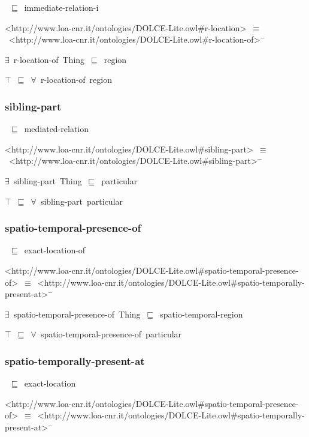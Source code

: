 \documentclass{article}
\begin{document}
~\ensuremath{\sqsubseteq}~immediate-relation-i

<http://www.loa-cnr.it/ontologies/DOLCE-Lite.owl#r-location>~\ensuremath{\equiv}~<http://www.loa-cnr.it/ontologies/DOLCE-Lite.owl#r-location-of>\ensuremath{^-}

\ensuremath{\exists}~r-location-of~Thing~\ensuremath{\sqsubseteq}~region

\ensuremath{\top}~\ensuremath{\sqsubseteq}~\ensuremath{\forall}~r-location-of~region

\subsubsection*{sibling-part}

~\ensuremath{\sqsubseteq}~mediated-relation

<http://www.loa-cnr.it/ontologies/DOLCE-Lite.owl#sibling-part>~\ensuremath{\equiv}~<http://www.loa-cnr.it/ontologies/DOLCE-Lite.owl#sibling-part>\ensuremath{^-}

\ensuremath{\exists}~sibling-part~Thing~\ensuremath{\sqsubseteq}~particular

\ensuremath{\top}~\ensuremath{\sqsubseteq}~\ensuremath{\forall}~sibling-part~particular

\subsubsection*{spatio-temporal-presence-of}

~\ensuremath{\sqsubseteq}~exact-location-of

<http://www.loa-cnr.it/ontologies/DOLCE-Lite.owl#spatio-temporal-presence-of>~\ensuremath{\equiv}~<http://www.loa-cnr.it/ontologies/DOLCE-Lite.owl#spatio-temporally-present-at>\ensuremath{^-}

\ensuremath{\exists}~spatio-temporal-presence-of~Thing~\ensuremath{\sqsubseteq}~spatio-temporal-region

\ensuremath{\top}~\ensuremath{\sqsubseteq}~\ensuremath{\forall}~spatio-temporal-presence-of~particular

\subsubsection*{spatio-temporally-present-at}

~\ensuremath{\sqsubseteq}~exact-location

<http://www.loa-cnr.it/ontologies/DOLCE-Lite.owl#spatio-temporal-presence-of>~\ensuremath{\equiv}~<http://www.loa-cnr.it/ontologies/DOLCE-Lite.owl#spatio-temporally-present-at>\ensuremath{^-}
\end{document}
